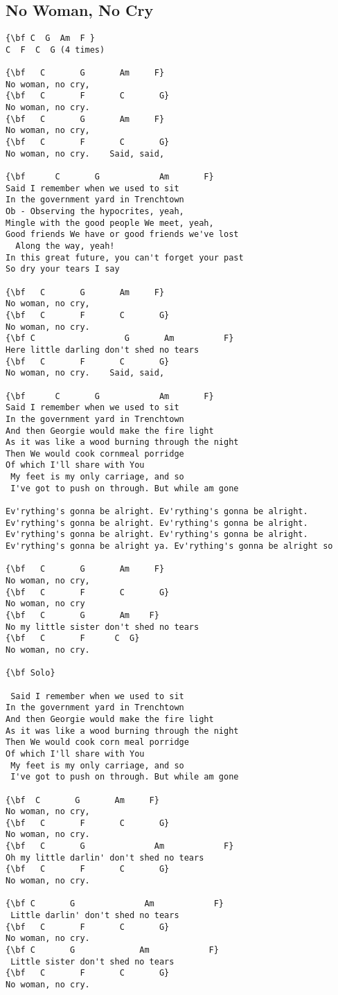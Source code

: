 \documentclass[a4paper]{article}
\begin{document}
\subsection{No Woman, No Cry} %
\label{sub:No Woman, No Cry}
\begin{Verbatim}[commandchars=\\\{\}]
{\bf C  G  Am  F }
C  F  C  G (4 times)

{\bf   C       G       Am     F}
No woman, no cry,
{\bf   C       F       C       G}
No woman, no cry.
{\bf   C       G       Am     F}
No woman, no cry,
{\bf   C       F       C       G}
No woman, no cry.    Said, said,

{\bf      C       G            Am       F}
Said I remember when we used to sit
In the government yard in Trenchtown
Ob - Observing the hypocrites, yeah,
Mingle with the good people We meet, yeah,
Good friends We have or good friends we've lost
  Along the way, yeah!
In this great future, you can't forget your past
So dry your tears I say

{\bf   C       G       Am     F}
No woman, no cry,
{\bf   C       F       C       G}
No woman, no cry.
{\bf C                  G       Am          F}
Here little darling don't shed no tears
{\bf   C       F       C       G}
No woman, no cry.    Said, said,

{\bf      C       G            Am       F}
Said I remember when we used to sit
In the government yard in Trenchtown
And then Georgie would make the fire light
As it was like a wood burning through the night
Then We would cook cornmeal porridge
Of which I'll share with You
 My feet is my only carriage, and so
 I've got to push on through. But while am gone

Ev'rything's gonna be alright. Ev'rything's gonna be alright.
Ev'rything's gonna be alright. Ev'rything's gonna be alright.
Ev'rything's gonna be alright. Ev'rything's gonna be alright.
Ev'rything's gonna be alright ya. Ev'rything's gonna be alright so

{\bf   C       G       Am     F}
No woman, no cry,
{\bf   C       F       C       G}
No woman, no cry 
{\bf   C       G       Am    F}
No my little sister don't shed no tears
{\bf   C       F      C  G}
No woman, no cry.

{\bf Solo}

 Said I remember when we used to sit
In the government yard in Trenchtown
And then Georgie would make the fire light
As it was like a wood burning through the night
Then We would cook corn meal porridge
Of which I'll share with You
 My feet is my only carriage, and so
 I've got to push on through. But while am gone

{\bf  C       G       Am     F}
No woman, no cry,
{\bf   C       F       C       G}
No woman, no cry.
{\bf   C       G              Am            F}
Oh my little darlin' don't shed no tears
{\bf   C       F       C       G}
No woman, no cry.

{\bf C       G              Am            F}
 Little darlin' don't shed no tears
{\bf   C       F       C       G}
No woman, no cry.
{\bf C       G             Am            F}
 Little sister don't shed no tears
{\bf   C       F       C       G}
No woman, no cry.
\end{Verbatim}
\newpage
\end{document}
